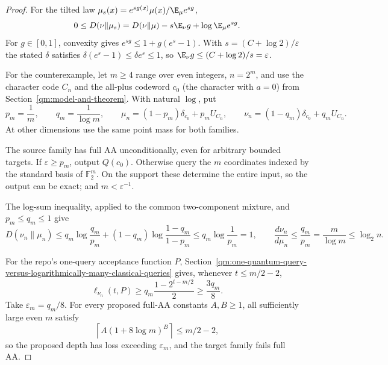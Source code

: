 \begin{proof}
For the tilted law
\(\mu_s(x)=e^{sg(x)}\mu(x)/\E_\mu e^{sg}\),
\[
 0\le D(\nu\|\mu_s)
 =D(\nu\|\mu)-s\E_\nu g+\log\E_\mu e^{sg}.
\]
For \(g\in[0,1]\), convexity gives
\(e^{sg}\le1+g(e^s-1)\). With
\(s=(C+\log2)/\varepsilon\) the stated \(\delta\) satisfies
\(\delta(e^s-1)\le\delta e^s\le1\), so \(\E_\nu g\le(C+\log2)/s=\varepsilon\).

For the counterexample, let \(m\ge4\) range over even integers,
\(n=2^m\), and use the character code \(C_n\) and the all-plus
codeword \(c_0\) (the character with \(a=0\)) from
Section~\ref{qm:model-and-theorem}. With natural \(\log\), put
\[
 p_m=\frac1m,\qquad q_m=\frac1{\log m},\qquad
 \mu_n=(1-p_m)\delta_{c_0}+p_mU_{C_n},\qquad
 \nu_n=(1-q_m)\delta_{c_0}+q_mU_{C_n}.
\]
At other dimensions use the same point mass for both families.

The source family has full AA unconditionally, even for arbitrary
bounded targets. If \(\varepsilon\ge p_m\), output \(Q(c_0)\).
Otherwise query the \(m\) coordinates indexed by the standard basis
of \(\mathbb F_2^m\). On the support these determine the entire input,
so the output can be exact; and \(m<\varepsilon^{-1}\).

The log-sum inequality, applied to the common two-component mixture,
and \(p_m\le q_m\le1\) give
\[
 D(\nu_n\|\mu_n)
 \le q_m\log\frac{q_m}{p_m}
 +(1-q_m)\log\frac{1-q_m}{1-p_m}
 \le q_m\log\frac1{p_m}=1,
 \qquad
 \frac{d\nu_n}{d\mu_n}\le\frac{q_m}{p_m}
 =\frac{m}{\log m}\le\log_2 n.
\]

For the repo's one-query acceptance function \(P\),
Section~\ref{qm:one-quantum-query-versus-logarithmically-many-classical-queries}
gives, whenever \(t\le m/2-2\),
\[
 \ell_{\nu_n}(t,P)
 \ge q_m\frac{1-2^{t-m/2}}2
 \ge\frac{3q_m}{8}.
\]
Take \(\varepsilon_m=q_m/8\). For every proposed full-AA constants
\(A,B\ge1\), all sufficiently large even \(m\) satisfy
\[
 \left\lceil A(1+8\log m)^B\right\rceil\le m/2-2,
\]
so the proposed depth has loss exceeding \(\varepsilon_m\), and the
target family fails full AA.
\end{proof}

